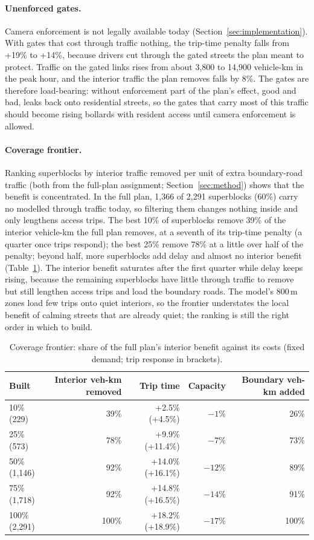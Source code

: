 \documentclass[11pt,a4paper]{article}
\begin{document}
\paragraph{Unenforced gates.}\label{sec:gates} Camera enforcement is not legally available today (Section~\ref{sec:implementation}). With gates that cost through traffic nothing, the trip-time penalty falls from +19\% to +14\%, because drivers cut through the gated streets the plan meant to protect. Traffic on the gated links rises from about 3,800 to 14,900 vehicle-km in the peak hour, and the interior traffic the plan removes falls by 8\%. The gates are therefore load-bearing: without enforcement part of the plan's effect, good and bad, leaks back onto residential streets, so the gates that carry most of this traffic should become rising bollards with resident access until camera enforcement is allowed.

\paragraph{Coverage frontier.} Ranking superblocks by interior traffic removed per unit of extra boundary-road traffic (both from the full-plan assignment; Section~\ref{sec:method}) shows that the benefit is concentrated. In the full plan, 1,366 of 2,291 superblocks (60\%) carry no modelled through traffic today, so filtering them changes nothing inside and only lengthens access trips. The best 10\% of superblocks remove 39\% of the interior vehicle-km the full plan removes, at a seventh of its trip-time penalty (a quarter once trips respond); the best 25\% remove 78\% at a little over half of the penalty; beyond half, more superblocks add delay and almost no interior benefit (Table~\ref{tab:frontier}). The interior benefit saturates after the first quarter while delay keeps rising, because the remaining superblocks have little through traffic to remove but still lengthen access trips and load the boundary roads. The model's 800\,m zones load few trips onto quiet interiors, so the frontier understates the local benefit of calming streets that are already quiet; the ranking is still the right order in which to build.

\begin{table}[ht]
\centering\small
\caption{Coverage frontier: share of the full plan's interior benefit against its costs (fixed demand; trip response in brackets).}\label{tab:frontier}
\begin{tabular}{@{}lrrrr@{}}
\toprule
Built & Interior veh-km removed & Trip time & Capacity & Boundary veh-km added \\
\midrule
10\% (229) & 39\% & +2.5\% (+4.5\%) & $-1$\% & 26\% \\
25\% (573) & 78\% & +9.9\% (+11.4\%) & $-7$\% & 73\% \\
50\% (1,146) & 92\% & +14.0\% (+16.1\%) & $-12$\% & 89\% \\
75\% (1,718) & 92\% & +14.8\% (+16.5\%) & $-14$\% & 91\% \\
100\% (2,291) & 100\% & +18.2\% (+18.9\%) & $-17$\% & 100\% \\
\bottomrule
\end{tabular}
\end{table}
\end{document}
